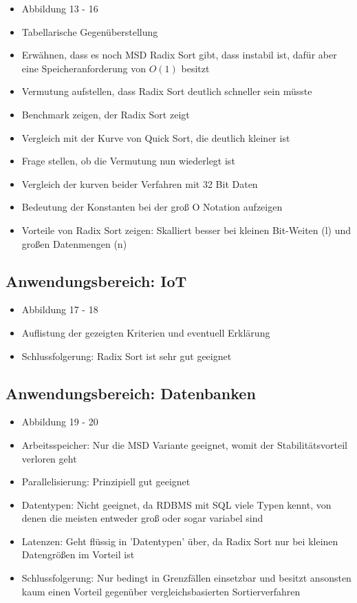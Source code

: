 \documentclass[a4paper, 12pt, oneside]{article}
\begin{document}
    \begin{itemize}
        \item Abbildung 13 - 16
        \item Tabellarische Gegenüberstellung
        \item Erwähnen, dass es noch MSD Radix Sort gibt, dass instabil ist, dafür aber eine Speicheranforderung von $O(1)$ besitzt
        \item Vermutung aufstellen, dass Radix Sort deutlich schneller sein müsste
        \item Benchmark zeigen, der Radix Sort zeigt
        \item Vergleich mit der Kurve von Quick Sort, die deutlich kleiner ist
        \item Frage stellen, ob die Vermutung nun wiederlegt ist
        \item Vergleich der kurven beider Verfahren mit 32 Bit Daten
        \item Bedeutung der Konstanten bei der groß O Notation aufzeigen
        \item Vorteile von Radix Sort zeigen: Skalliert besser bei kleinen Bit-Weiten (l) und großen Datenmengen (n)
    \end{itemize}

    \subsection{Anwendungsbereich: IoT}

    \begin{itemize}
        \item Abbildung 17 - 18
        \item Auflistung der gezeigten Kriterien und eventuell Erklärung
        \item Schlussfolgerung: Radix Sort ist sehr gut geeignet
    \end{itemize}

    \subsection{Anwendungsbereich: Datenbanken}

    \begin{itemize}
        \item Abbildung 19 - 20
        \item Arbeitsspeicher: Nur die MSD Variante geeignet, womit der Stabilitätsvorteil verloren geht
        \item Parallelisierung: Prinzipiell gut geeignet
        \item Datentypen: Nicht geeignet, da RDBMS mit SQL viele Typen kennt, von denen die meisten entweder groß oder sogar variabel sind
        \item Latenzen: Geht flüssig in 'Datentypen' über, da Radix Sort nur bei kleinen Datengrößen im Vorteil ist
        \item Schlussfolgerung: Nur bedingt in Grenzfällen einsetzbar und besitzt ansonsten kaum einen Vorteil gegenüber vergleichsbasierten Sortierverfahren
    \end{itemize}
\end{document}

